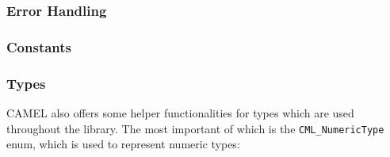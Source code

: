 \documentclass[a4paper,oneside,8pt]{extarticle}
\theoremstyle{definition}
\begin{document}
\subsubsection{Error Handling}

\subsubsection{Constants}

\subsubsection{Types}

CAMEL also offers some helper functionalities for types which are used throughout the library. The most important of which is the \texttt{CML\_NumericType} enum, which is used to represent numeric types: \newline
\end{document}
